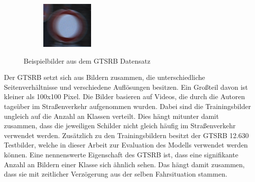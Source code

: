 \begin{figure}[H]
\begin{subfigure}[b]{0.125\textwidth}
       \caption{}
       \label{fig:gtrsb-paper-bsp-image-3}
   \end{subfigure}
   \hspace{3em}%
   \begin{subfigure}[b]{0.125\textwidth}
    \centering
    \includegraphics[height=\textwidth]{../images/GTSRB/00052.png}
    \caption{}
    \label{fig:gtrsb-paper-bsp-image-4}
\end{subfigure}
      \caption{Beispielbilder aus dem \acs{GTSRB} Datensatz \cite{GTSRB}}
      \label{fig:gtrsb-paper-bsp-images}
\end{figure}

Der \ac{GTSRB} setzt sich aus Bildern zusammen, die unterschiedliche Seitenverhältnisse und verschiedene Auflösungen besitzen. Ein Großteil davon ist kleiner als 100x100 Pixel. Die Bilder basieren auf Videos, die durch die Autoren tagsüber im Straßenverkehr aufgenommen wurden. Dabei sind die Trainingsbilder ungleich auf die Anzahl an Klassen verteilt. Dies hängt mitunter damit zusammen, dass die jeweiligen Schilder nicht gleich häufig im Straßenverkehr verwendet werden. Zusätzlich zu den Trainingsbildern besitzt der \ac{GTSRB} 12.630 Testbilder, welche in dieser Arbeit zur Evaluation des Modells verwendet werden können. Eine nennenswerte Eigenschaft des \ac{GTSRB} ist, dass eine signifikante Anzahl an Bildern einer Klasse sich ähnlich sehen. Das hängt damit zusammen, dass sie mit zeitlicher Verzögerung aus der selben Fahrsituation stammen. \cite{GTSRB}

